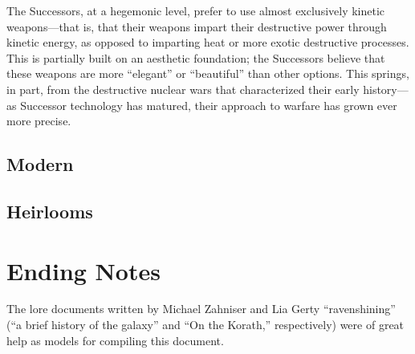 \documentclass[11pt]{report}
\begin{document}
    The Successors, at a hegemonic level, prefer to use almost exclusively kinetic weapons---that is, that their weapons impart their destructive power through kinetic energy, as opposed to imparting heat or more exotic destructive processes. This is partially built on an aesthetic foundation; the Successors believe that these weapons are more ``elegant'' or ``beautiful'' than other options. This springs, in part, from the destructive nuclear wars that characterized their early history---as Successor technology has matured, their approach to warfare has grown ever more precise.

    \subsection{Modern}
    \subsection{Heirlooms}
    \section{Ending Notes}
    The lore documents written by Michael Zahniser and Lia Gerty ``ravenshining'' (``a brief history of the galaxy'' and ``On the Korath,'' respectively) were of great help as models for compiling this document.
\end{document}

